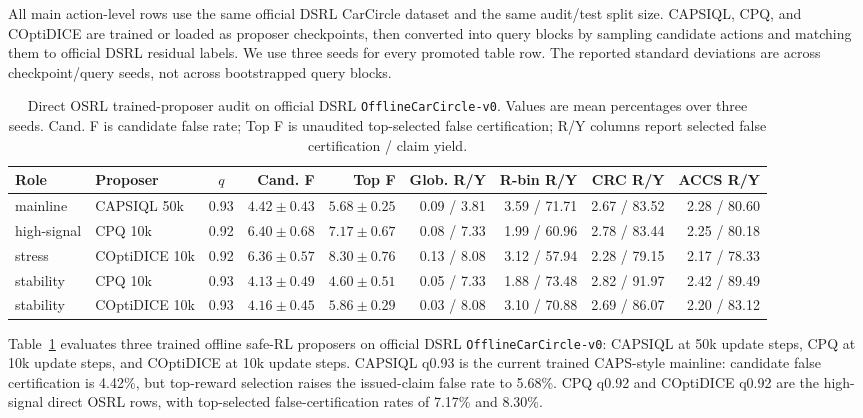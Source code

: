 \documentclass[letterpaper]{article}
\begin{document}
All main action-level rows use the same official DSRL CarCircle dataset and
the same audit/test split size. CAPSIQL, CPQ, and COptiDICE are trained or
loaded as proposer checkpoints, then converted into query blocks by sampling
candidate actions and matching them to official DSRL residual labels. We use
three seeds for every promoted table row. The reported standard deviations are
across checkpoint/query seeds, not across bootstrapped query blocks.

\begin{table}[t]
\centering
\small
\setlength{\tabcolsep}{2.5pt}
\begin{tabular}{llcrrrrrr}
\toprule
Role & Proposer & $q$ & Cand. F & Top F & Glob. R/Y & R-bin R/Y & CRC R/Y & ACCS R/Y \\
\midrule
mainline & CAPSIQL 50k & 0.93 & $4.42{\pm}0.43$ & $5.68{\pm}0.25$ & 0.09 / 3.81 & 3.59 / 71.71 & 2.67 / 83.52 & 2.28 / 80.60 \\
high-signal & CPQ 10k & 0.92 & $6.40{\pm}0.68$ & $7.17{\pm}0.67$ & 0.08 / 7.33 & 1.99 / 60.96 & 2.78 / 83.44 & 2.25 / 80.18 \\
stress & COptiDICE 10k & 0.92 & $6.36{\pm}0.57$ & $8.30{\pm}0.76$ & 0.13 / 8.08 & 3.12 / 57.94 & 2.28 / 79.15 & 2.17 / 78.33 \\
\midrule
stability & CPQ 10k & 0.93 & $4.13{\pm}0.49$ & $4.60{\pm}0.51$ & 0.05 / 7.33 & 1.88 / 73.48 & 2.82 / 91.97 & 2.42 / 89.49 \\
stability & COptiDICE 10k & 0.93 & $4.16{\pm}0.45$ & $5.86{\pm}0.29$ & 0.03 / 8.08 & 3.10 / 70.88 & 2.69 / 86.07 & 2.20 / 83.12 \\
\bottomrule
\end{tabular}
\caption{Direct OSRL trained-proposer audit on official DSRL \texttt{OfflineCarCircle-v0}. Values are mean percentages over three seeds. Cand. F is candidate false rate; Top F is unaudited top-selected false certification; R/Y columns report selected false certification / claim yield.}
\label{tab:direct-osrl-main}
\end{table}

Table~\ref{tab:direct-osrl-main} evaluates three trained offline safe-RL
proposers on official DSRL \texttt{OfflineCarCircle-v0}: CAPSIQL at 50k update
steps, CPQ at 10k update steps, and COptiDICE at 10k update steps. CAPSIQL
q0.93 is the current trained CAPS-style mainline: candidate false certification
is 4.42\%, but top-reward selection raises the issued-claim false rate to
5.68\%. CPQ q0.92 and COptiDICE q0.92 are the high-signal direct OSRL rows,
with top-selected false-certification rates of 7.17\% and 8.30\%.
\end{document}
